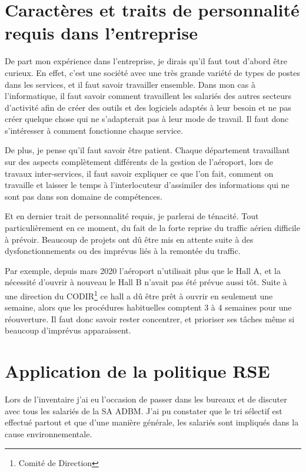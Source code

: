 \section{Caractères et traits de personnalité requis dans l'entreprise}

De part mon expérience dans l'entreprise, je dirais qu'il faut tout d'abord être curieux. En effet, c'est une société avec une très grande variété de types de postes dans les services, et il faut savoir travailler ensemble.
Dans mon cas à l'informatique, il faut savoir comment travaillent les salariés des autres secteurs d'activité afin de créer des outils et des logiciels adaptés à leur besoin et ne pas créer quelque chose qui ne s'adapterait pas à leur mode de travail.
Il faut donc s'intéresser à comment fonctionne chaque service.\newline

De plus, je pense qu'il faut savoir être patient. Chaque département travaillant sur des aspects complètement différents de la gestion de l'aéroport, lors de travaux inter-services, il faut savoir expliquer ce que l'on fait, comment on travaille et laisser le temps à l'interlocuteur d'assimiler des informations qui ne sont pas dans son domaine de compétences.\newline

Et en dernier trait de personnalité requis, je parlerai de ténacité. Tout particulièrement en ce moment, du fait de la forte reprise du traffic aérien difficile à prévoir. Beaucoup de projets ont dû être mis en attente suite à des dysfonctionnements ou des imprévus liés à la remontée du traffic.

Par exemple, depuis mars 2020 l’aéroport n’utilisait plus que le Hall A, et la nécessité d’ouvrir à nouveau le Hall B n’avait pas été prévue aussi tôt. Suite à une direction du CODIR\footnote{Comité de Direction} ce hall a dû être prêt à ouvrir en seulement une semaine, alors que les procédures habituelles comptent 3 à 4 semaines pour une réouverture. Il faut donc savoir rester concentrer, et prioriser ses tâches même si beaucoup d'imprévus apparaissent.

\newpage

\section{Application de la politique RSE}

Lors de l'inventaire j'ai eu l'occasion de passer dans les bureaux et de discuter avec tous les salariés de la SA ADBM. J'ai pu constater que le tri sélectif est effectué partout et que d'une manière générale, les salariés sont impliqués dans la cause environnementale.\newline

